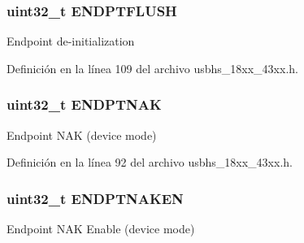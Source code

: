 \subsubsection[{\texorpdfstring{E\+N\+D\+P\+T\+F\+L\+U\+SH}{ENDPTFLUSH}}]{ uint32\+\_\+t E\+N\+D\+P\+T\+F\+L\+U\+SH}\hypertarget{struct_l_p_c___u_s_b_h_s___t_aded3da9b001d55174b4f9feddbae2fe5}{}\label{struct_l_p_c___u_s_b_h_s___t_aded3da9b001d55174b4f9feddbae2fe5}
Endpoint de-\/initialization 

Definición en la línea 109 del archivo usbhs\+\_\+18xx\+\_\+43xx.\+h.

\subsubsection[{\texorpdfstring{E\+N\+D\+P\+T\+N\+AK}{ENDPTNAK}}]{ uint32\+\_\+t E\+N\+D\+P\+T\+N\+AK}\hypertarget{struct_l_p_c___u_s_b_h_s___t_aad4a9fdd99ed4783645771045d0926cf}{}\label{struct_l_p_c___u_s_b_h_s___t_aad4a9fdd99ed4783645771045d0926cf}
Endpoint N\+AK (device mode) 

Definición en la línea 92 del archivo usbhs\+\_\+18xx\+\_\+43xx.\+h.

\subsubsection[{\texorpdfstring{E\+N\+D\+P\+T\+N\+A\+K\+EN}{ENDPTNAKEN}}]{ uint32\+\_\+t E\+N\+D\+P\+T\+N\+A\+K\+EN}\hypertarget{struct_l_p_c___u_s_b_h_s___t_aa815df0960fe8c19f268c141d9a3a1a4}{}\label{struct_l_p_c___u_s_b_h_s___t_aa815df0960fe8c19f268c141d9a3a1a4}
Endpoint N\+AK Enable (device mode) 

